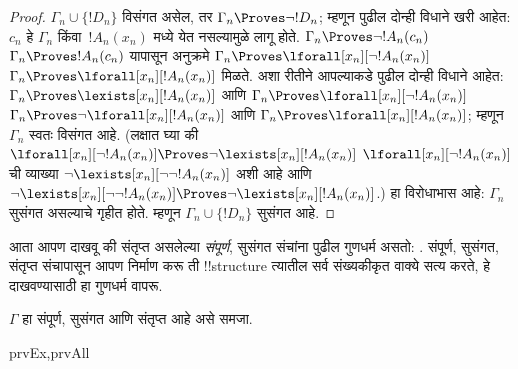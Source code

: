\documentclass[../../../include/open-logic-section]{subfiles}
\begin{document}
\begin{proof}
$\Gamma_n \cup \{!D_n\}$ विसंगत असेल, तर $\Gamma_n
\Proves \lnot !D_n$; म्हणून पुढील दोन्ही विधाने खरी आहेत:
$c_n$ हे $\Gamma_n$ किंवा~$!A_n(x_n)$ मध्ये येत नसल्यामुळे
लागू होते.
{$\Gamma_n \Proves \lnot !A_n(c_n)$}
{$\Gamma_n \Proves !A_n(c_n)$}
यापासून अनुक्रमे
{$\Gamma_n \Proves \lforall[x_n][\lnot !A_n(x_n)]$}
{$\Gamma_n \Proves \lforall[x_n][!A_n(x_n)]$}
मिळते. अशा रीतीने आपल्याकडे पुढील दोन्ही विधाने आहेत:
{$\Gamma_n \Proves \lexists[x_n][!A_n(x_n)]$ आणि
$\Gamma_n \Proves \lforall[x_n][\lnot !A_n(x_n)]$}
{$\Gamma_n \Proves \lnot\lforall[x_n][!A_n(x_n)]$ आणि
$\Gamma_n \Proves \lforall[x_n][!A_n(x_n)]$};
म्हणून $\Gamma_n$ स्वतः विसंगत आहे.
{(लक्षात घ्या की
{$\lforall[x_n][\lnot !A_n(x_n)] \Proves
  \lnot\lexists[x_n][!A_n(x_n)]$}
{$\lforall[x_n][\lnot !A_n(x_n)]$ ची व्याख्या
  $\lnot\lexists[x_n][\lnot\lnot !A_n(x_n)]$ अशी आहे आणि
  $\lnot\lexists[x_n][\lnot\lnot !A_n(x_n)] \Proves
  \lnot\lexists[x_n][!A_n(x_n)]$}.)}{}
हा विरोधाभास आहे: $\Gamma_n$ सुसंगत असल्याचे गृहीत होते. म्हणून
$\Gamma_n \cup \{ !D_n\}$ सुसंगत आहे.
%
\end{proof}

\begin{explain}
आता आपण दाखवू की संतृप्त असलेल्या \emph{संपूर्ण}, सुसंगत संचांना पुढील
गुणधर्म असतो: . संपूर्ण, सुसंगत, संतृप्त संचापासून
आपण निर्माण करू ती !!{structure} त्यातील सर्व संख्यकीकृत वाक्ये सत्य करते,
हे दाखवण्यासाठी हा गुणधर्म वापरू.
\end{explain}

\begin{prop}
$\Gamma$ हा संपूर्ण, सुसंगत आणि संतृप्त आहे असे समजा.
\begin{tagenumerate}{prvEx,prvAll}
\end{tagenumerate}
\end{prop}
\end{document}
